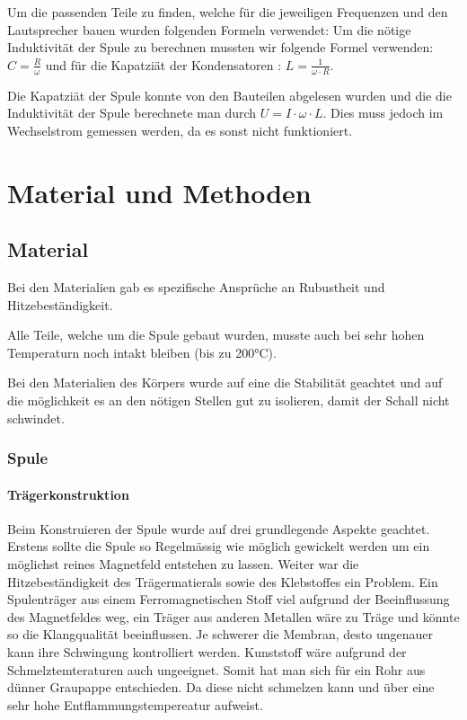 \documentclass[a4paper,11pt]{report}
\begin{document}
Um die passenden Teile zu finden, welche für die jeweiligen Frequenzen und den Lautsprecher bauen wurden folgenden Formeln verwendet:
Um die nötige Induktivität der Spule zu berechnen mussten wir folgende Formel verwenden: $C = \frac{R}{\omega}$ und für die Kapatziät der Kondensatoren : $L = \frac{1}{\omega \cdot R}$.

Die Kapatziät der Spule konnte von den Bauteilen abgelesen wurden und die die Induktivität der Spule berechnete man durch $U = I \cdot \omega \cdot L$. Dies muss jedoch im Wechselstrom gemessen werden, da es sonst nicht funktioniert.
\chapter{Material und Methoden}
\section{Material}
Bei den Materialien gab es spezifische Ansprüche an Rubustheit und Hitzebeständigkeit.

Alle Teile, welche um die Spule gebaut wurden, musste auch bei sehr hohen Temperaturn noch intakt bleiben (bis zu 200°C).

Bei den Materialien des Körpers wurde auf eine die Stabilität geachtet und auf die möglichkeit es an den nötigen Stellen gut zu isolieren, damit der Schall nicht schwindet.

\subsection{Spule}
\subsubsection*{Trägerkonstruktion}

Beim Konstruieren der Spule wurde auf drei grundlegende Aspekte geachtet. Erstens sollte die Spule so Regelmässig wie möglich gewickelt werden um ein möglichst reines Magnetfeld entstehen zu lassen. Weiter war die Hitzebeständigkeit des Trägermatierals sowie des Klebstoffes ein Problem. Ein Spulenträger aus einem Ferromagnetischen Stoff viel aufgrund der Beeinflussung des Magnetfeldes weg, ein Träger aus anderen Metallen wäre zu Träge und könnte so die Klangqualität beeinflussen. Je schwerer die Membran, desto ungenauer kann ihre Schwingung kontrolliert werden. Kunststoff wäre aufgrund der Schmelztemteraturen auch ungeeignet. Somit hat man sich für ein Rohr aus dünner Graupappe entschieden. Da diese nicht schmelzen kann und über eine sehr hohe Entflammungstempereatur aufweist. 
\end{document}
